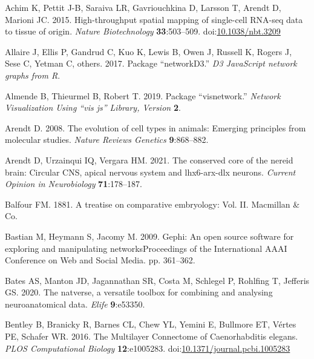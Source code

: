 \documentclass[
  11pt,
]{article}
\newlength{\cslhangindent}
\newenvironment{CSLReferences}[2] %
 {\begin{list}{}{%
  \setlength{\itemindent}{0pt}
  \setlength{\leftmargin}{0pt}
  \setlength{\parsep}{0pt}
  \ifodd #1
   \setlength{\leftmargin}{\cslhangindent}
   \setlength{\itemindent}{-1\cslhangindent}
  \fi
  \setlength{\itemsep}{#2\baselineskip}}}
 {\end{list}}
\begin{document}
\hfill\break

\label{refs}
\begin{CSLReferences}{1}{0}
Achim K, Pettit J-B, Saraiva LR, Gavriouchkina D, Larsson T, Arendt D,
Marioni JC. 2015. High-throughput spatial mapping of single-cell RNA-seq
data to tissue of origin. \emph{Nature Biotechnology}
\textbf{33}:503--509.
doi:\href{https://doi.org/10.1038/nbt.3209}{10.1038/nbt.3209}

Allaire J, Ellis P, Gandrud C, Kuo K, Lewis B, Owen J, Russell K, Rogers
J, Sese C, Yetman C, others. 2017. Package {``networkD3.''} \emph{D3
JavaScript network graphs from R}.

Almende B, Thieurmel B, Robert T. 2019. Package {``visnetwork.''}
\emph{Network Visualization Using {``vis js''} Library, Version}
\textbf{2}.

Arendt D. 2008. The evolution of cell types in animals: Emerging
principles from molecular studies. \emph{Nature Reviews Genetics}
\textbf{9}:868--882.

Arendt D, Urzainqui IQ, Vergara HM. 2021. The conserved core of the
nereid brain: Circular CNS, apical nervous system and lhx6-arx-dlx
neurons. \emph{Current Opinion in Neurobiology} \textbf{71}:178--187.

Balfour FM. 1881. A treatise on comparative embryology: Vol. II.
Macmillan \& Co.

Bastian M, Heymann S, Jacomy M. 2009. Gephi: An open source software for
exploring and manipulating networksProceedings of the International AAAI
Conference on Web and Social Media. pp. 361--362.

Bates AS, Manton JD, Jagannathan SR, Costa M, Schlegel P, Rohlfing T,
Jefferis GS. 2020. The natverse, a versatile toolbox for combining and
analysing neuroanatomical data. \emph{Elife} \textbf{9}:e53350.

Bentley B, Branicky R, Barnes CL, Chew YL, Yemini E, Bullmore ET, Vértes
PE, Schafer WR. 2016. The Multilayer Connectome of Caenorhabditis
elegans. \emph{PLOS Computational Biology} \textbf{12}:e1005283.
doi:\href{https://doi.org/10.1371/journal.pcbi.1005283}{10.1371/journal.pcbi.1005283}


\end{CSLReferences}
\end{document}
